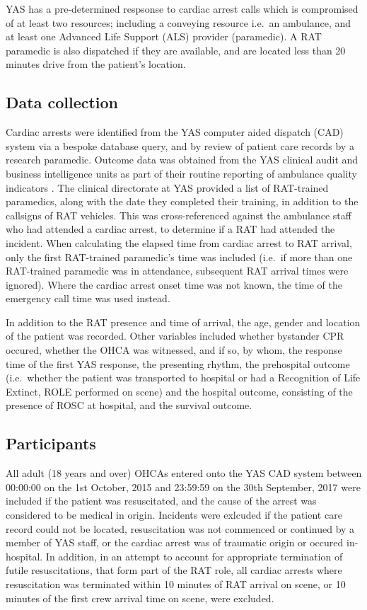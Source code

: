 \documentclass[]{article}
\theoremstyle{definition}
\theoremstyle{definition}
\theoremstyle{definition}
\theoremstyle{remark}
\begin{document}
YAS has a pre-determined respsonse to cardiac arrest calls which is
compromised of at least two resources; including a conveying resource
i.e.~an ambulance, and at least one Advanced Life Support (ALS) provider
(paramedic). A RAT paramedic is also dispatched if they are available,
and are located less than 20 minutes drive from the patient's location.

\hypertarget{data-collection}{%
\subsection{Data collection}\label{data-collection}}

Cardiac arrests were identified from the YAS computer aided dispatch
(CAD) system via a bespoke database query, and by review of patient care
records by a research paramedic. Outcome data was obtained from the YAS
clinical audit and business intelligence units as part of their routine
reporting of ambulance quality indicators
\citep{nhs_england_ambulance_2015}. The clinical directorate at YAS
provided a list of RAT-trained paramedics, along with the date they
completed their training, in addition to the callsigns of RAT vehicles.
This was cross-referenced against the ambulance staff who had attended a
cardiac arrest, to determine if a RAT had attended the incident. When
calculating the elapsed time from cardiac arrest to RAT arrival, only
the first RAT-trained paramedic's time was included (i.e.~if more than
one RAT-trained paramedic was in attendance, subsequent RAT arrival
times were ignored). Where the cardiac arrest onset time was not known,
the time of the emergency call time was used instead.

In addition to the RAT presence and time of arrival, the age, gender and
location of the patient was recorded. Other variables included whether
bystander CPR occured, whether the OHCA was witnessed, and if so, by
whom, the response time of the first YAS response, the presenting
rhythm, the prehospital outcome (i.e.~whether the patient was
transported to hospital or had a Recognition of Life Extinct, ROLE
performed on scene) and the hospital outcome, consisting of the presence
of ROSC at hospital, and the survival outcome.

\hypertarget{participants}{%
\subsection{Participants}\label{participants}}

All adult (18 years and over) OHCAs entered onto the YAS CAD system
between 00:00:00 on the 1st October, 2015 and 23:59:59 on the 30th
September, 2017 were included if the patient was resuscitated, and the
cause of the arrest was considered to be medical in origin. Incidents
were exlcuded if the patient care record could not be located,
resuscitation was not commenced or continued by a member of YAS staff,
or the cardiac arrest was of traumatic origin or occured in-hospital. In
addition, in an attempt to account for appropriate termination of futile
resuscitations, that form part of the RAT role, all cardiac arrests
where resuscitation was terminated within 10 minutes of RAT arrival on
scene, or 10 minutes of the first crew arrival time on scene, were
excluded.
\end{document}
